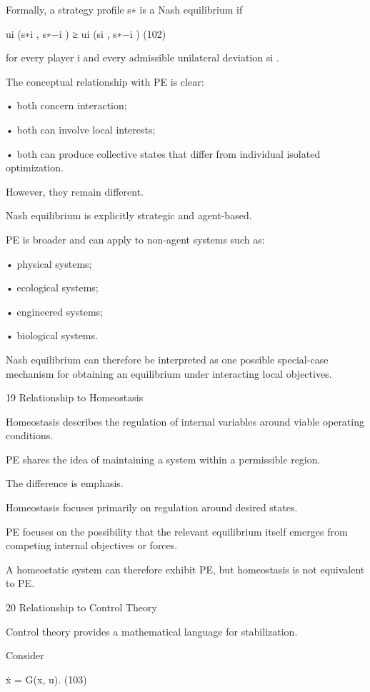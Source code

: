 \documentclass[10pt,a4paper]{article}
\begin{document}
\begin{ManuscriptText}
Formally, a strategy profile s∗ is a Nash equilibrium if


                                       ui (s∗i , s∗−i ) ≥ ui (si , s∗−i )                   (102)

for every player i and every admissible unilateral deviation si .

The conceptual relationship with PE is clear:


  • both concern interaction;

  • both can involve local interests;

  • both can produce collective states that differ from individual isolated optimization.


However, they remain different.

Nash equilibrium is explicitly strategic and agent-based.

PE is broader and can apply to non-agent systems such as:


  • physical systems;

  • ecological systems;

  • engineered systems;

  • biological systems.


Nash equilibrium can therefore be interpreted as one possible special-case mechanism for obtaining
an equilibrium under interacting local objectives.


19     Relationship to Homeostasis

Homeostasis describes the regulation of internal variables around viable operating conditions.

PE shares the idea of maintaining a system within a permissible region.

The difference is emphasis.

Homeostasis focuses primarily on regulation around desired states.

PE focuses on the possibility that the relevant equilibrium itself emerges from competing internal
objectives or forces.

A homeostatic system can therefore exhibit PE, but homeostasis is not equivalent to PE.


20      Relationship to Control Theory

Control theory provides a mathematical language for stabilization.

Consider


                                           ẋ = G(x, u).                                   (103)


\end{ManuscriptText}
\end{document}
